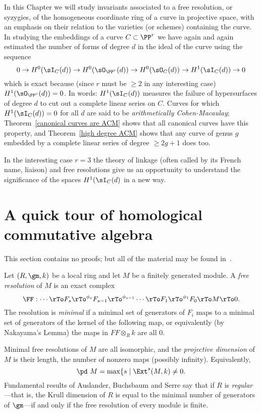 In this Chapter we will study  invariants associated to a free resolution, or syzygies, of the homogeneous coordinate ring of a curve in projective space, with an emphasis on their relation to the varieties (or schemes) containing the curve. 
In studying the embeddings of a curve $C\subset \PP^r$  we have again and again estimated the number of
forms of degree $d$ in the ideal of the curve using the sequence
$$
0\to H^0(\sI_C(d)) \to H^0(\sO_{\PP^r}(d))\to  H^0(\sO_C(d)) \to H^1(\sI_C(d))\to 0
$$
which is exact because (since $r$ must be $\geq 2$ in any interesting case) $H^1(\sO_{\PP^r}(d))= 0$. In words: 
$H^1(\sI_C(d))$ measures the failure of hypersurfaces of degree $d$ to cut out a complete linear series on $C$. Curves for which
$H^1(\sI_C(d))=0$ for all $d$ are said to be \emph{arithmetically Cohen-Macaulay}; Theorem~\ref{canonical curves are ACM} shows that
all canonical curves have this property, and Theorem~\ref{high degree ACM} shows that any curve of genus $g$ embedded by a
 complete linear series of degree $\geq 2g+1$ does too.
  
In the interesting case $r=3$ the theory of linkage (often called by its French name, liaison) and free resolutions give us an opportunity
to understand the significance of the spaces $H^1(\sI_C(d)$ in a new way. 

\section{A quick tour of homological commutative algebra}
This section contains no proofs; but all of the material may be found in~\cite{Eisenbud1995}.

Let $(R,\gm, k)$ be a local ring and let $M$ be a finitely generated module. A \emph{free resolution} of $M$ is an exact complex
$$
\FF: \cdots \rTo F_s \rTo^{\phi_s} F_{s-1} \rTo^{\phi_{s-1}} \cdots \rTo F_1 \rTo^{\phi_1}  F_0 \rTo M \rTo 0.
$$
The resolution is \emph{minimal} if a minimal set of generators of $F_i$ maps to a minimal set of generators of the kernel of the following map,
or equivalently (by Nakayama's Lemma) the maps in $FF\otimes_R k$ are all 0.

Minimal free resolutions of $M$ are all isomorphic, and the \emph{projective dimension}  of $M$ is their length, the number of nonzero
maps (possibly infinity). Equivalently, 
$$
\pd\ M = \max\{s \mid \Ext^s(M,k) \neq 0.
$$
Fundamental
results of Auslander, Buchsbaum and Serre say that if $R$ is \emph{regular}---that is, the Krull dimension of $R$ is equal to the minimal number
of generators of $\gm$---if and only if the free resolution of every module is finite.

